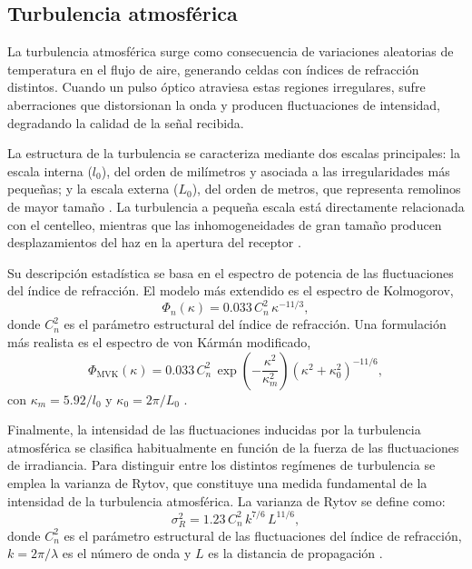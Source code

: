 \subsection{Turbulencia atmosférica}
La turbulencia atmosférica surge como consecuencia de variaciones aleatorias de temperatura en el flujo de aire, generando celdas con índices de refracción distintos. Cuando un pulso óptico atraviesa estas regiones irregulares, sufre aberraciones que distorsionan la onda y producen fluctuaciones de intensidad, degradando la calidad de la señal recibida\cite{Trichili}.  


La estructura de la turbulencia se caracteriza mediante dos escalas principales: la escala interna ($l_0$), del orden de milímetros y asociada a las irregularidades más pequeñas; y la escala externa ($L_0$), del orden de metros, que representa remolinos de mayor tamaño \cite{Andrews}. La turbulencia a pequeña escala está directamente relacionada con el centelleo, mientras que las inhomogeneidades de gran tamaño producen desplazamientos del haz en la apertura del receptor \cite{Trichili}.

Su descripción estadística se basa en el espectro de potencia de las fluctuaciones del índice de refracción. El modelo más extendido es el espectro de Kolmogorov,
\begin{equation}
\Phi_{n}(\kappa) = 0.033\, C_{n}^{2}\, \kappa^{-11/3},
\end{equation}
donde $C_n^2$ es el parámetro estructural del índice de refracción. Una formulación más realista es el espectro de von Kármán modificado, 
\begin{equation}
\Phi_{\mathrm{MVK}}(\kappa) = 0.033\, C_{n}^{2}\, 
\exp\left(-\frac{\kappa^{2}}{\kappa_{m}^{2}}\right)
\left(\kappa^{2} + \kappa_{0}^{2}\right)^{-11/6},
\end{equation}
con $\kappa_m = 5.92/l_0$ y $\kappa_0 = 2\pi/L_0$ \cite{Trichili}.



Finalmente, la intensidad de las fluctuaciones inducidas por la turbulencia atmosférica se clasifica habitualmente en función de la fuerza de las fluctuaciones de irradiancia. Para distinguir entre los distintos regímenes de turbulencia se emplea la varianza de Rytov, que constituye una medida fundamental de la intensidad de la turbulencia atmosférica. La varianza de Rytov se define como:
\begin{equation}
\sigma_R^2 = 1.23\, C_n^2\, k^{7/6}\, L^{11/6},
\end{equation}
donde $C_n^2$ es el parámetro estructural de las fluctuaciones del índice de refracción, $k = 2\pi/\lambda$ es el número de onda y $L$ es la distancia de propagación \cite{Phillips}.

